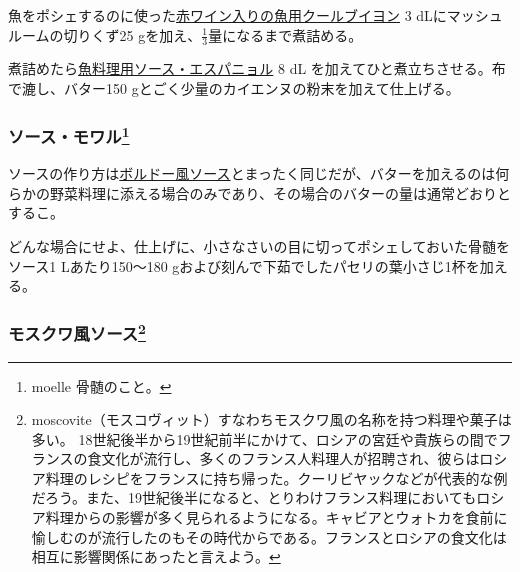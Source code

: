 \begin{recette}

 

魚をポシェするのに使った\protect\hyperlink{court-bouillon-c}{赤ワイン入りの魚用クールブイヨン}
3 dLにマッシュルームの切りくず25
gを加え、\(\frac{1}{3}\)量になるまで煮詰める。

煮詰めたら\protect\hyperlink{sauce-espagnole-maigre}{魚料理用ソース・エスパニョル}
8 dL を加えてひと煮立ちさせる。布で漉し、バター150
gとごく少量のカイエンヌの粉末を加えて仕上げる。

\atoaki{}

\hypertarget{sauce-moelle}{%
\subsubsection[ソース・モワル]{\texorpdfstring{ソース・モワル\footnote{moelle
  骨髄のこと。}}{ソース・モワル}}\label{sauce-moelle}}


 

ソースの作り方は\protect\hyperlink{sauce-bordelaise}{ボルドー風ソース}とまったく同じだが、バターを加えるのは何らかの野菜料理に添える場合のみであり、その場合のバターの量は通常どおりとするこ。

どんな場合にせよ、仕上げに、小さなさいの目に切ってポシェしておいた骨髄をソース1
Lあたり150〜180 gおよび刻んで下茹でしたパセリの葉小さじ1杯を加える。

\atoaki{}

\hypertarget{sauce-moscovite}{%
\subsubsection[モスクワ風ソース]{\texorpdfstring{モスクワ風ソース\footnote{moscovite（モスコヴィット）すなわちモスクワ風の名称を持つ料理や菓子は多い。
  18世紀後半から19世紀前半にかけて、ロシアの宮廷や貴族らの間でフランスの食文化が流行し、多くのフランス人料理人が招聘され、彼らはロシア料理のレシピをフランスに持ち帰った。クーリビヤックなどが代表的な例だろう。また、19世紀後半になると、とりわけフランス料理においてもロシア料理からの影響が多く見られるようになる。キャビアとウォトカを食前に愉しむのが流行したのもその時代からである。フランスとロシアの食文化は相互に影響関係にあったと言えよう。}}{モスクワ風ソース}}\label{sauce-moscovite}}


\end{recette}
